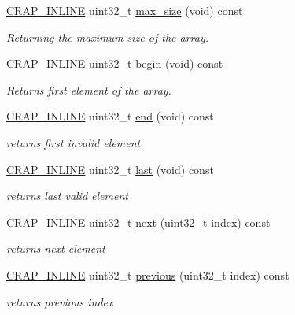 \begin{DoxyCompactItemize}
\item 
\hyperlink{config__x86_8h_a5a40526b8d842e7ff731509998bb0f1c}{C\+R\+A\+P\+\_\+\+I\+N\+L\+I\+N\+E} uint32\+\_\+t \hyperlink{classcrap_1_1sorted__array_a13a95ae7b2941347d60cb984c9e39a16}{max\+\_\+size} (void) const 
\begin{DoxyCompactList}\small\item\em Returning the maximum size of the array. \end{DoxyCompactList}\item 
\hyperlink{config__x86_8h_a5a40526b8d842e7ff731509998bb0f1c}{C\+R\+A\+P\+\_\+\+I\+N\+L\+I\+N\+E} uint32\+\_\+t \hyperlink{classcrap_1_1sorted__array_a83a8f70389a4ef6fc253b09b5451d2ae}{begin} (void) const 
\begin{DoxyCompactList}\small\item\em Returns first element of the array. \end{DoxyCompactList}\item 
\hyperlink{config__x86_8h_a5a40526b8d842e7ff731509998bb0f1c}{C\+R\+A\+P\+\_\+\+I\+N\+L\+I\+N\+E} uint32\+\_\+t \hyperlink{classcrap_1_1sorted__array_a36c18186d8ee7a7ec354e5a66e6290fa}{end} (void) const 
\begin{DoxyCompactList}\small\item\em returns first invalid element \end{DoxyCompactList}\item 
\hyperlink{config__x86_8h_a5a40526b8d842e7ff731509998bb0f1c}{C\+R\+A\+P\+\_\+\+I\+N\+L\+I\+N\+E} uint32\+\_\+t \hyperlink{classcrap_1_1sorted__array_a8381fa6352db0e0aa4658804d6bc55b3}{last} (void) const 
\begin{DoxyCompactList}\small\item\em returns last valid element \end{DoxyCompactList}\item 
\hyperlink{config__x86_8h_a5a40526b8d842e7ff731509998bb0f1c}{C\+R\+A\+P\+\_\+\+I\+N\+L\+I\+N\+E} uint32\+\_\+t \hyperlink{classcrap_1_1sorted__array_a45778a5a4b586b2c5eb41b814e50ed6d}{next} (uint32\+\_\+t index) const 
\begin{DoxyCompactList}\small\item\em returns next element \end{DoxyCompactList}\item 
\hyperlink{config__x86_8h_a5a40526b8d842e7ff731509998bb0f1c}{C\+R\+A\+P\+\_\+\+I\+N\+L\+I\+N\+E} uint32\+\_\+t \hyperlink{classcrap_1_1sorted__array_a14d4d1a846c7dbc43e0384367a95838f}{previous} (uint32\+\_\+t index) const 
\begin{DoxyCompactList}\small\item\em returns previous index \end{DoxyCompactList}\item 

\end{DoxyCompactItemize}
